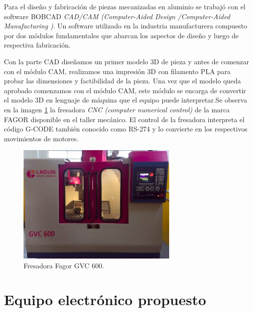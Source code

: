 Para el diseño y fabricación de piezas mecanizadas en aluminio se trabajó con el software BOBCAD \citep{web_bobcad} \textit{CAD/CAM (Computer-Aided Design /Computer-Aided Manufacturing )}. Un software  utilizado en la industria manufacturera compuesto por dos módulos fundamentales que abarcan los aspectos de diseño y luego de respectiva fabricación.  

Con la parte CAD diseñamos un primer modelo 3D de pieza y antes de comenzar con el módulo CAM, realizamos  una impresión 3D con filamento PLA para probar las dimensiones y factibilidad de la pieza.
Una vez que el modelo queda aprobado comenzamos con el módulo CAM, este módulo se encarga de convertir el modelo 3D en lenguaje de máquina que el equipo puede interpretar.Se observa en la imagen \ref{fig:fagor} la fresadora \textit{ CNC (computer numerical control)} de la marca FAGOR \citep{web_fagor} disponible en el taller mecánico. El control de la fresadora interpreta el código G-CODE también conocido como RS-274 \citep{web_gcode} y lo convierte en los respectivos movimientos de motores.


\begin{figure}[ht]
\centering 
\includegraphics[width=0.7\textwidth]{./Figures/fagor.png}
\caption{Fresadora Fagor GVC 600.}
\label{fig:fagor}
\end{figure}
 

\section{Equipo electrónico propuesto}


